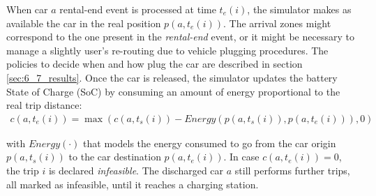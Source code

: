 When car $a$ rental-end event is processed at time $t_{e}(i)$, the simulator makes as available the car in the real position $p(a,t_{e}(i))$. The arrival zones might correspond to the one present in the \emph{rental-end} event, or it might be necessary to manage a slightly user's re-routing due to vehicle plugging procedures. The policies to decide when and how plug the car are described in section \ref{sec:6_7_results}. Once the car is released, the simulator updates the battery State of Charge (SoC) by consuming an amount of energy proportional to the real trip distance:
\begin{eqnarray*}
	c(a,t_{e}(i)) = \nonumber \hspace{0cm}   \max{(c(a,t_{s}(i)) - Energy(p(a,t_{s}(i)), p(a,t_{e}(i))), 0)} 
\end{eqnarray*}

with $Energy(\cdot)$ that models the energy consumed to go from the car origin $p(a,t_{s}(i))$ to the car destination $p(a,t_{e}(i))$.
In case $c(a,t_{e}(i)) = 0$, the trip $i$ is declared {\it infeasible}. 
The discharged car $a$ still performs further trips, all marked as infeasible, until it reaches a charging station.

%
%
%	
%		
%	
%		
%		
%	
%	

